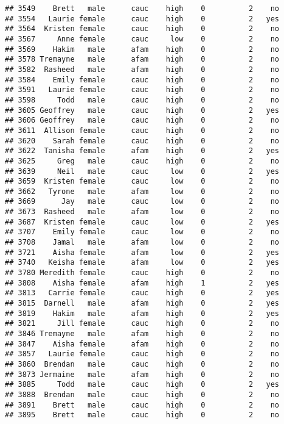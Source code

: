 \documentclass[
]{article}
\begin{document}
\begin{verbatim}
## 3549    Brett   male      cauc    high    0          2    no
## 3554   Laurie female      cauc    high    0          2   yes
## 3564  Kristen female      cauc    high    0          2    no
## 3567     Anne female      cauc     low    0          2    no
## 3569    Hakim   male      afam    high    0          2    no
## 3578 Tremayne   male      afam    high    0          2    no
## 3582  Rasheed   male      afam    high    0          2    no
## 3584    Emily female      cauc    high    0          2    no
## 3591   Laurie female      cauc    high    0          2    no
## 3598     Todd   male      cauc    high    0          2    no
## 3605 Geoffrey   male      cauc    high    0          2   yes
## 3606 Geoffrey   male      cauc    high    0          2    no
## 3611  Allison female      cauc    high    0          2    no
## 3620    Sarah female      cauc    high    0          2    no
## 3622  Tanisha female      afam    high    0          2   yes
## 3625     Greg   male      cauc    high    0          2    no
## 3639     Neil   male      cauc     low    0          2   yes
## 3659  Kristen female      cauc     low    0          2    no
## 3662   Tyrone   male      afam     low    0          2    no
## 3669      Jay   male      cauc     low    0          2    no
## 3673  Rasheed   male      afam     low    0          2    no
## 3687  Kristen female      cauc     low    0          2   yes
## 3707    Emily female      cauc     low    0          2    no
## 3708    Jamal   male      afam     low    0          2    no
## 3721    Aisha female      afam     low    0          2   yes
## 3740   Keisha female      afam     low    0          2   yes
## 3780 Meredith female      cauc    high    0          2    no
## 3808    Aisha female      afam    high    1          2   yes
## 3813   Carrie female      cauc    high    0          2   yes
## 3815  Darnell   male      afam    high    0          2   yes
## 3819    Hakim   male      afam    high    0          2   yes
## 3821     Jill female      cauc    high    0          2    no
## 3846 Tremayne   male      afam    high    0          2    no
## 3847    Aisha female      afam    high    0          2    no
## 3857   Laurie female      cauc    high    0          2    no
## 3860  Brendan   male      cauc    high    0          2    no
## 3873 Jermaine   male      afam    high    0          2    no
## 3885     Todd   male      cauc    high    0          2   yes
## 3888  Brendan   male      cauc    high    0          2    no
## 3891    Brett   male      cauc    high    0          2    no
## 3895    Brett   male      cauc    high    0          2    no

\end{verbatim}
\end{document}
